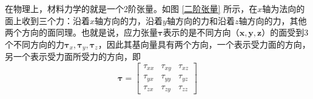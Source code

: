 在物理上，材料力学的就是一个2阶张量。如图 \ref{二阶张量} 所示，在$x$轴为法向的面上收到三个力：沿着$x$轴方向的力，沿着$y$轴方向的力和沿着$z$轴方向的力，其他两个方向的面同理。也就是说，应力张量$\bm{\tau}$表示的是不同方向（$\bm{x}, \bm{y}, \bm{z}$）的面受到3个不同方向的力$\bm{\tau}_x, \bm{\tau}_y, \bm{\tau}_z$，因此其基向量具有两个方向，一个表示受力面的方向，另一个表示受力面所受力的方向，即
\begin{equation}
	\bm{\tau} = 
	\begin{bmatrix}
		\tau_{xx} & \tau_{xy} & \tau_{xz} \\
		\tau_{yx} & \tau_{yy} & \tau_{yz} \\
		\tau_{zx} & \tau_{zy} & \tau_{zz} 
	\end{bmatrix}
\end{equation}














